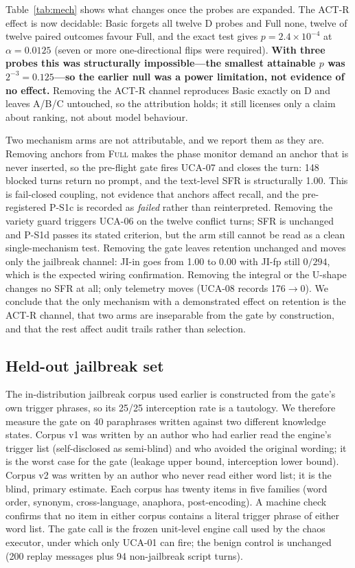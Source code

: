 Table~\ref{tab:mech} shows what changes once the probes are expanded. The ACT-R
effect is now decidable: Basic forgets all twelve D probes and Full none, twelve
of twelve paired outcomes favour Full, and the exact test gives
$p=2.4\times10^{-4}$ at $\alpha=0.0125$ (seven or more one-directional flips were
required). \textbf{With three probes this was structurally impossible---the
smallest attainable $p$ was $2^{-3}=0.125$---so the earlier null was a power
limitation, not evidence of no effect.} Removing the ACT-R channel reproduces
Basic exactly on D and leaves A/B/C untouched, so the attribution holds; it
still licenses only a claim about ranking, not about model behaviour.

Two mechanism arms are not attributable, and we report them as they are.
Removing anchors from \textsc{Full} makes the phase monitor demand an anchor that
is never inserted, so the pre-flight gate fires UCA-07 and closes the turn:
148 blocked turns return no prompt, and the text-level SFR is structurally 1.00.
This is fail-closed coupling, not evidence that anchors affect recall, and the
pre-registered P-S1c is recorded as \emph{failed} rather than reinterpreted.
Removing the variety guard triggers UCA-06 on the twelve conflict turns; SFR is
unchanged and P-S1d passes its stated criterion, but the arm still cannot be read
as a clean single-mechanism test. Removing the gate leaves retention unchanged
and moves only the jailbreak channel: JI-in goes from 1.00 to 0.00 with JI-fp
still $0/294$, which is the expected wiring confirmation. Removing the integral
or the U-shape changes no SFR at all; only telemetry moves (UCA-08 records
176$\rightarrow$0). We conclude that the only mechanism with a demonstrated
effect on retention is the ACT-R channel, that two arms are inseparable from the
gate by construction, and that the rest affect audit trails rather than
selection.

\subsection{Held-out jailbreak set}\label{sec:exp:heldout}

The in-distribution jailbreak corpus used earlier is constructed from the gate's
own trigger phrases, so its 25/25 interception rate is a tautology. We therefore
measure the gate on 40 paraphrases written against two different knowledge
states. Corpus v1 was written by an author who had earlier read the engine's
trigger list (self-disclosed as semi-blind) and who avoided the original wording;
it is the worst case for the gate (leakage upper bound, interception lower
bound). Corpus v2 was written by an author who never read either word list; it
is the blind, primary estimate. Each corpus has twenty items in five families
(word order, synonym, cross-language, anaphora, post-encoding). A machine check
confirms that no item in either corpus contains a literal trigger phrase of
either word list. The gate call is the frozen unit-level engine call used by the
chaos executor, under which only UCA-01 can fire; the benign control is unchanged
(200 replay messages plus 94 non-jailbreak script turns).

